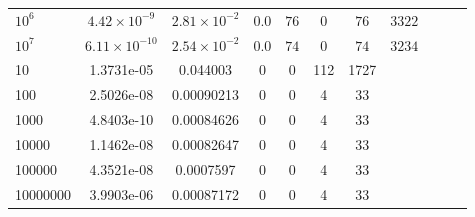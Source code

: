 \begin{tabular}{l c c c c c c c c c c}
$10^6$  &  $4.42 \times 10^{-9}$  &  $2.81 \times 10^{-2}$  &  $0.0$  &  $76$  &  $0$  &  $76$  &  $3322$  & & & \\ 
$10^7$  &  $6.11 \times 10^{-10}$  &  $2.54 \times 10^{-2}$  &  $0.0$  &  $74$  &  $0$  &  $74$  &  $3234$  & & & \\ 
\hline \hline
10  &  1.3731e-05  &  0.044003  &  0  &  0  &  112  &  1727  \\ 
100  &  2.5026e-08  &  0.00090213  &  0  &  0  &  4  &  33  \\ 
1000  &  4.8403e-10  &  0.00084626  &  0  &  0  &  4  &  33  \\ 
10000  &  1.1462e-08  &  0.00082647  &  0  &  0  &  4  &  33  \\ 
100000  &  4.3521e-08  &  0.0007597  &  0  &  0  &  4  &  33  \\ 
10000000  &  3.9903e-06  &  0.00087172  &  0  &  0  &  4  &  33  \\ 
\end{tabular}
